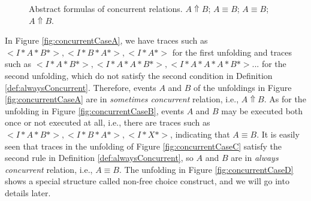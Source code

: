 \documentclass{llncs}
\begin{document}
\begin{figure}[htbp]
{\begin{minipage}[b]{0.3\textwidth}
	\end{minipage}
	\label{fig:concurrentCaseC}
}
\caption{Abstract formulas of concurrent relations.  $A\Uparrow B$;  $A\equiv B$;  $A\equiv B$;  $A\Uparrow B$.\label{fig:concurrentCases}}
\end{figure}

In Figure \ref{fig:concurrentCaseA}, we have traces such as $<I*A*B*>,<I*B*A*>,<I*A*>$ for the first unfolding and traces such as $<I*A*B*>,<I*A*A*B*>,<I*A*A*A*B*>...$ for the second unfolding, which do not satisfy the second condition in Definition \ref{def:alwaysConcurrent}. Therefore, events $A$ and $B$ of the unfoldings in Figure \ref{fig:concurrentCaseA} are in \textit{sometimes concurrent} relation, i.e., $A\Uparrow B$. As for the unfolding in Figure \ref{fig:concurrentCaseB}, events $A$ and $B$ may be executed both once or not executed at all, i.e., there are traces such as $<I*A*B*>,<I*B*A*>,<I*X*>$, indicating that $A\equiv B$. It is easily seen that traces in the unfolding of Figure \ref{fig:concurrentCaseC} satisfy the second rule in Definition \ref{def:alwaysConcurrent}, so $A$ and $B$ are in \textit{always concurrent} relation, i.e., $A\equiv B$. The unfolding in Figure \ref{fig:concurrentCaseD} shows a special structure called non-free choice construct, and we will go into details later.
\end{document}
